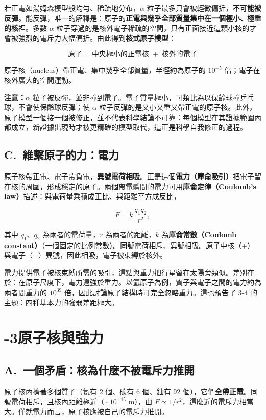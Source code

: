 \documentclass[11pt]{article}
\begin{document}
若正電如湯姆森模型般均勻、稀疏地分布，$\alpha$ 粒子最多只會被輕微偏折，\textbf{不可能被反彈}。能反彈，唯一的解釋是：原子的\textbf{正電與幾乎全部質量集中在一個極小、極重的核}裡。多數 $\alpha$ 粒子穿過的是核外電子稀疏的空間，只有正面接近這顆小核的才會被強烈的電斥力大幅偏折。由此得到\textbf{核式原子模型}：

$$\boxed{\;\text{原子}=\text{中央極小的正電核}\;+\;\text{核外的電子}\;}$$

原子核（nucleus）帶正電、集中幾乎全部質量，半徑約為原子的 $10^{-5}$ 倍；電子在核外廣大的空間運動。

\textbf{注意：}$\alpha$ 粒子被反彈，並非撞到電子。電子質量極小，可類比為以保齡球撞乒乓球，不會使保齡球反彈；使 $\alpha$ 粒子反彈的是又小又重又帶正電的原子核。此外，原子模型一個接一個被修正，並不代表科學結論不可靠：每個模型在其證據範圍內都成立，新證據出現時才被更精確的模型取代，這正是科學自我修正的過程。

\subsection*{\sffamily C.\ 維繫原子的力：電力}

原子核帶正電、電子帶負電，\textbf{異號電荷相吸}。正是這個\textbf{電力（庫侖吸引）}把電子留在核的周圍，形成穩定的原子。兩個帶電體間的電力可用\textbf{庫侖定律（Coulomb's law）}描述：與電荷量乘積成正比、與距離平方成反比，

$$F=k\,\frac{q_1 q_2}{r^2},$$

其中 $q_1$、$q_2$ 為兩者的電荷量，$r$ 為兩者的距離，$k$ 為\textbf{庫侖常數（Coulomb constant）}（一個固定的比例常數）。同號電荷相斥、異號相吸。原子中核（$+$）與電子（$-$）異號，因此相吸，電子被束縛於核外。

電力提供電子被核束縛所需的吸引，這點與重力把行星留在太陽旁類似。差別在於：在原子尺度下，電力遠強於重力。以氫原子為例，質子與電子之間的電力約為兩者間重力的 $10^{39}$ 倍，因此討論原子結構時可完全忽略重力。這也預告了 3-4 的主題：四種基本力的強弱差距極大。

\section*{-3\quad 原子核與強力}

\subsection*{\sffamily A.\ 一個矛盾：核為什麼不被電斥力推開}

原子核內擠著多個質子（氦有 2 個、碳有 6 個、鈾有 92 個），它們\textbf{全帶正電}。同號電荷相斥，且核內距離極近（$\sim10^{-15}$ m），由 $F\propto 1/r^2$，這麼近的電斥力相當大。僅就電力而言，原子核應被自己的電斥力推開。
\end{document}
